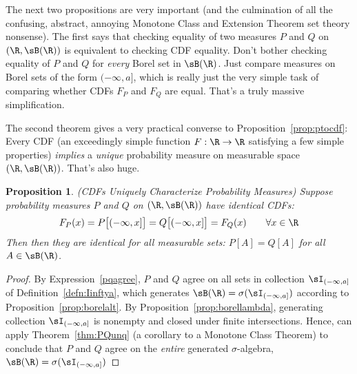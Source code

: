 \documentclass[12pt]{article}
\theoremstyle{plain}
\newtheorem{prop}[thm]{Proposition}
\theoremstyle{definition}
\theoremstyle{remark}
\newcommand{\ra}{\rightarrow}
\begin{document}
\clearpage
The next two propositions are very important (and the culmination of all
the confusing, abstract, annoying Monotone Class and Extension Theorem
set theory nonsense).
The first says that checking equality of two measures $P$ and $Q$ on
$(\R,\sB(\R))$ is equivalent to checking CDF equality. Don't bother
checking equality of $P$ and $Q$ for \emph{every} Borel set in
$\sB(\R)$.  Just compare measures on Borel sets of the form
$(-\infty,a]$, which is really just the very simple task of comparing
whether CDFs $F_P$ and $F_Q$ are equal. That's a truly massive
simplification.

The second theorem gives a very practical converse to
Proposition~\ref{prop:ptocdf}: Every CDF (an exceedingly simple function
$F:\R\ra\R$ satisfying a few simple properties) \emph{implies} a
\emph{unique} probability measure on measurable space $(\R,\sB(\R))$.
That's also huge.

\begin{prop}\emph{(CDFs Uniquely Characterize Probability Measures)}
\label{prop:cdfunq}
Suppose probability measures $P$ and $Q$ on $(\R,\sB(\R))$ have
identical CDFs:
\begin{align}
  F_P(x)
  = P\big[(-\infty,x]\big]
  = Q\big[(-\infty,x]\big]
  =F_Q(x) \qquad \forall x\in\R
  \label{pqagree}
\end{align}
Then then they are identical for all measurable sets:
$P[A] = Q[A]$ for all $A \in \sB(\R)$.
\end{prop}
\begin{proof}
By Expression~\ref{pqagree}, $P$ and $Q$ agree on all sets in
collection $\sI_{(-\infty,a]}$ of Definition~\ref{defn:Iinftya},
which generates $\sB(\R)=\sigma(\sI_{(-\infty,a]})$ according to
Proposition~\ref{prop:borelalt}.  By
Proposition~\ref{prop:borellambda}, generating collection
$\sI_{(-\infty,a]}$ is nonempty and closed under finite intersections.
Hence, can apply Theorem~\ref{thm:PQunq} (a corollary to a Monotone
Class Theorem) to conclude that $P$ and $Q$ agree on the
\emph{entire} generated $\sigma$-algebra,
$\sB(\R)=\sigma(\sI_{(-\infty,a]})$
\end{proof}
\end{document}
